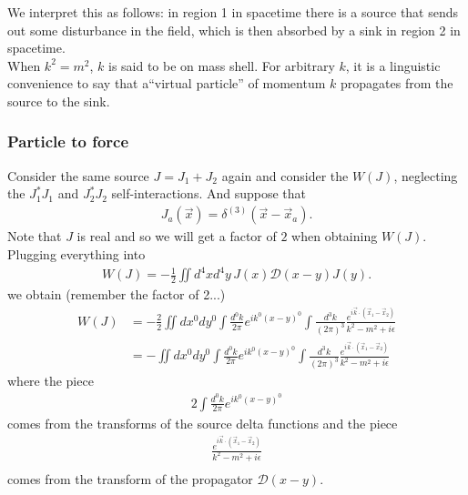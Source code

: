 \documentclass{book}
\theoremstyle{definition}
\newcommand{\f}[2]{\frac{#1}{#2}}
\newcommand{\D}{\mathcal{D}}
\begin{document}
We interpret this as follows: in region 1 in spacetime there is a source that sends out some disturbance in the field, which is then absorbed by a sink in region 2 in spacetime. \\

When $k^2 = m^2$, $k$ is said to be on mass shell. For arbitrary $k$, it is a linguistic convenience to say that a``virtual particle'' of momentum $k$ propagates from
the source to the sink.











\subsubsection{Particle to force}


Consider the same source $J = J_1 + J_2$ again and consider the $W(J)$, neglecting the $J_1^*J_1$ and $J_2^*J_2$ self-interactions. And suppose that 
\begin{align}
J_a(\vec{x}) = \delta^{(3)}(\vec{x} - \vec{x}_a).
\end{align}
Note that $J$ is real and so we will get a factor of $2$ when obtaining $W(J)$. \\

Plugging everything into 
\begin{align}
W(J) = -\f{1}{2}\iint d^4xd^4y\, J(x)\D(x-y)J(y).
\end{align}
we obtain (remember the factor of 2...)
\begin{align}
W(J) &= -\f{2}{2}\iint dx^0 dy^0 \int \f{d^0k}{2\pi} e^{ik^0(x-y)^0} \int \f{d^3k }{(2\pi)^3} \f{e^{i\vec{k}\cdot (\vec{x}_1 - \vec{x}_2)}}{k^2 - m^2 + i\epsilon}\\
&= -\iint dx^0 dy^0 \int \f{d^0k}{2\pi} e^{ik^0(x-y)^0} \int \f{d^3k }{(2\pi)^3} \f{e^{i\vec{k}\cdot (\vec{x}_1 - \vec{x}_2)}}{k^2 - m^2 + i\epsilon}
\end{align}
where the piece
\begin{align}
2\int \f{d^0k}{2\pi} e^{ik^0(x-y)^0}
\end{align}
comes from the transforms of the source delta functions and the piece
\begin{align}
\f{e^{i\vec{k}\cdot (\vec{x}_1 - \vec{x}_2)}}{k^2 - m^2 + i\epsilon} \\
\end{align} 
comes from the transform of the propagator $\D(x-y)$. \\
\end{document}

